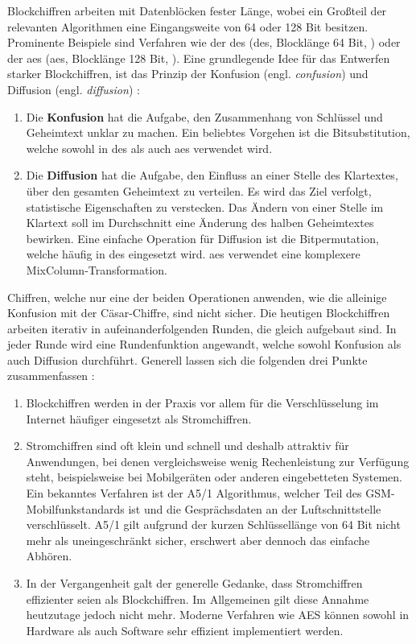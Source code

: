 \noindent
Blockchiffren arbeiten mit Datenblöcken fester Länge, wobei ein Großteil der
relevanten Algorithmen eine Eingangsweite von 64 oder 128 Bit besitzen.
Prominente Beispiele sind Verfahren wie der \acl{des}
(\acs{des}, Blocklänge 64 Bit, \cite[55-58]{BOOK:crypto}) oder der \acl{aes}
(\acs{aes}, Blocklänge 128 Bit, \cite[87-90]{BOOK:crypto}).
Eine grundlegende Idee für das Entwerfen starker Blockchiffren, ist das Prinzip
der Konfusion (engl. \textit{confusion}) und
Diffusion (engl. \textit{diffusion}) \parencite[57]{BOOK:crypto}:
\begin{enumerate}
  \item Die \textbf{Konfusion} hat die Aufgabe, den
        Zusammenhang von Schlüssel und Geheimtext unklar zu machen. Ein
        beliebtes Vorgehen ist die Bitsubstitution, welche sowohl in \acs{des} als auch
        \acs{aes} verwendet wird.
  \item Die \textbf{Diffusion} hat die Aufgabe, den Einfluss
        an einer Stelle des Klartextes, über den gesamten Geheimtext zu verteilen. Es wird
        das Ziel verfolgt, statistische Eigenschaften zu verstecken.
        Das Ändern von einer Stelle im Klartext
        soll im Durchschnitt eine Änderung des halben Geheimtextes bewirken. Eine einfache
        Operation für Diffusion ist die Bitpermutation, welche häufig in \acs{des} eingesetzt wird.
        \acs{aes} verwendet eine komplexere MixColumn-Transformation.
\end{enumerate}
Chiffren, welche nur eine der beiden Operationen anwenden, wie die alleinige Konfusion
mit der Cäsar-Chiffre, sind nicht sicher. Die heutigen Blockchiffren
arbeiten iterativ in aufeinanderfolgenden Runden, die gleich aufgebaut sind. In jeder Runde wird eine
Rundenfunktion angewandt, welche sowohl Konfusion als auch Diffusion durchführt.
Generell lassen sich die folgenden drei Punkte zusammenfassen \parencite[31]{BOOK:crypto}:

\begin{enumerate}
  \item Blockchiffren werden in der Praxis vor allem für die Verschlüsselung im Internet
        häufiger eingesetzt als Stromchiffren.
  \item Stromchiffren sind oft klein und schnell und deshalb attraktiv für Anwendungen,
        bei denen vergleichsweise wenig Rechenleistung zur Verfügung steht, beispielsweise bei
        Mobilgeräten oder anderen eingebetteten Systemen. Ein bekanntes Verfahren ist der
        A5/1 Algorithmus, welcher Teil des GSM-Mobilfunkstandards ist und die Gesprächsdaten
        an der Luftschnittstelle verschlüsselt. A5/1 gilt aufgrund der kurzen Schlüssellänge von
        64 Bit nicht mehr als uneingeschränkt sicher, erschwert aber dennoch das einfache Abhören.
  \item In der Vergangenheit galt der generelle Gedanke, dass Stromchiffren
        effizienter seien als Blockchiffren.
        Im Allgemeinen gilt diese Annahme heutzutage jedoch nicht mehr. Moderne Verfahren wie AES
        können sowohl in Hardware als auch Software sehr effizient implementiert werden.
\end{enumerate}

